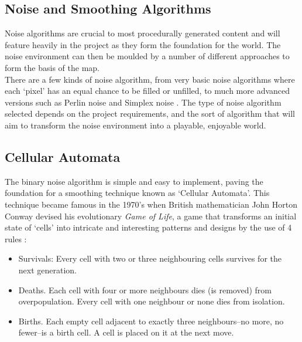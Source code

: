 \documentclass[12pt,a4paper]{article}
\begin{document}
\subsection{Noise and Smoothing Algorithms}
\label{subsec:noise}

Noise algorithms are crucial to most procedurally generated content and will feature heavily in the project as they form the foundation for the world. The noise environment can then be moulded by a number of different approaches to form the basis of the map. \\

There are a few kinds of noise algorithm, from very basic noise algorithms where each `pixel' has an equal chance to be filled or unfilled, to much more advanced versions such as Perlin noise and Simplex noise \cite{textmodel}\cite{improvepnoise}. The type of noise algorithm selected depends on the project requirements, and the sort of algorithm that will aim to transform the noise environment into a playable, enjoyable world. 



\subsection{Cellular Automata}

The binary noise algorithm is simple and easy to implement, paving the foundation for a smoothing technique known as `Cellular Automata'. This technique became famous in the 1970's when British mathematician John Horton Conway devised his evolutionary \emph{Game of Life}, a game that transforms an initial state of `cells' into intricate and interesting patterns and designs by the use of 4 rules \cite{cellauto}: 

\begin{itemize}
	\item Survivals: Every cell with two or three neighbouring cells survives for the next generation.
	\item Deaths. Each cell with four or more neighbours dies (is removed) from overpopulation. Every cell with one neighbour or none dies from isolation.
	\item Births. Each empty cell adjacent to exactly three neighbours--no more, no fewer--is a birth cell. A cell is placed on it at the next move.
\end{itemize}
\end{document}
